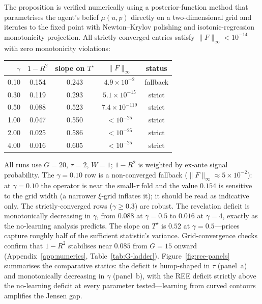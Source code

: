 \documentclass[12pt,letterpaper]{article}
\theoremstyle{definition}
\theoremstyle{remark}
\newcommand{\Tstar}{T^{\!\star}}
\newcommand{\1}{\mathbf{1}}
\begin{document}
The proposition is verified numerically using a posterior-function method
that parametrises the agent's belief $\mu(u,p)$ directly on a
two-dimensional grid and iterates to the fixed point with
Newton--Krylov polishing and isotonic-regression monotonicity
projection. All strictly-converged entries satisfy
$\|F\|_{\infty}<10^{-14}$ with zero monotonicity violations:
\begin{center}
\renewcommand{\arraystretch}{1.05}
\begin{tabular}{rcccc}
\toprule
$\gamma$ & $1-R^{2}$ & slope on $\Tstar$ & $\|F\|_\infty$ & status \\
\midrule
\rowcolor{black!15} 0.10 & 0.154 & 0.243 & $4.9\times 10^{-2}$ & fallback \\
\rowcolor{black!15} 0.30 & 0.119 & 0.293 & $5.1\times 10^{-15}$ & strict \\
0.50 & 0.088 & 0.523 & $7.4\times 10^{-119}$ & strict \\
1.00 & 0.047 & 0.550 & $<10^{-25}$ & strict \\
2.00 & 0.025 & 0.586 & $<10^{-25}$ & strict \\
4.00 & 0.016 & 0.605 & $<10^{-25}$ & strict \\
\bottomrule
\end{tabular}
\end{center}
All runs use $G=20$, $\tau=2$, $W=1$; $1\!-\!R^{2}$ is weighted by
ex-ante signal probability. The $\gamma=0.10$ row is a non-converged
fallback ($\|F\|_{\infty}\!\approx\!5\times10^{-2}$): at $\gamma=0.10$ the
operator is near the small-$\tau$ fold and the value $0.154$ is sensitive
to the grid width (a narrower $\xi$-grid inflates it); it should be read as
indicative only. The strictly-converged rows ($\gamma\ge0.3$) are robust.
The revelation deficit is
monotonically decreasing in $\gamma$, from $0.088$ at $\gamma=0.5$
to $0.016$ at $\gamma=4$, exactly as the no-learning analysis predicts.
The slope on $\Tstar$ is $0.52$ at $\gamma=0.5$---prices capture
roughly half of the sufficient statistic's variance. Grid-convergence
checks confirm that $1-R^{2}$ stabilises near $0.085$ from $G=15$
onward (Appendix~\ref{app:numerics}, Table~\ref{tab:G-ladder}).
Figure~\ref{fig:ree-panels} summarises the comparative statics: the
deficit is hump-shaped in $\tau$ (panel~a) and monotonically decreasing
in $\gamma$ (panel~b), with the REE deficit strictly above the
no-learning deficit at every parameter tested---learning from curved
contours amplifies the Jensen gap.
\end{document}
